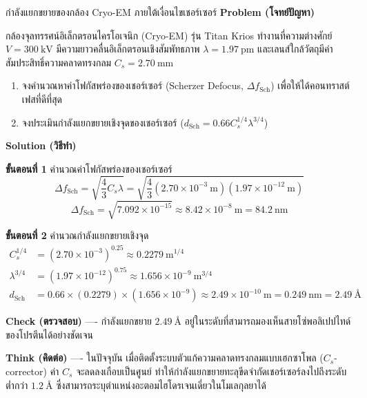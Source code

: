 \begin{psctbox}{กำลังแยกขยายของกล้อง Cryo-EM ภายใต้เงื่อนไขเชอร์เซอร์}
\textbf{Problem (โจทย์ปัญหา)}

กล้องจุลทรรศน์อิเล็กตรอนไครโอเจนิก (Cryo-EM) รุ่น Titan Krios ทำงานที่ความต่างศักย์ $V = 300~\text{kV}$ มีความยาวคลื่นอิเล็กตรอนเชิงสัมพัทธภาพ $\lambda = 1.97~\text{pm}$ และเลนส์ใกล้วัตถุมีค่าสัมประสิทธิ์ความคลาดทรงกลม $C_s = 2.70~\text{mm}$
\begin{enumerate}
    \item จงคำนวณหาค่าโฟกัสพร่องของเชอร์เซอร์ (Scherzer Defocus, $\Delta f_{\text{Sch}}$) เพื่อให้ได้คอนทราสต์เฟสที่ดีที่สุด
    \item จงประเมินกำลังแยกขยายเชิงจุดของเชอร์เซอร์ ($d_{\text{Sch}} = 0.66 C_s^{1/4} \lambda^{3/4}$)
\end{enumerate}

\textbf{Solution (วิธีทำ)}

\textbf{ขั้นตอนที่ 1} คำนวณค่าโฟกัสพร่องของเชอร์เซอร์
\begin{equation*}
\Delta f_{\text{Sch}} = \sqrt{\frac{4}{3} C_s \lambda} = \sqrt{\frac{4}{3}(2.70 \times 10^{-3}~\text{m})(1.97 \times 10^{-12}~\text{m})}
\end{equation*}
\begin{equation*}
\Delta f_{\text{Sch}} = \sqrt{7.092 \times 10^{-15}} \approx 8.42 \times 10^{-8}~\text{m} = 84.2~\text{nm}
\end{equation*}

\textbf{ขั้นตอนที่ 2} คำนวณกำลังแยกขยายเชิงจุด
\begin{align*}
C_s^{1/4} &= (2.70 \times 10^{-3})^{0.25} \approx 0.2279~\text{m}^{1/4} \\
\lambda^{3/4} &= (1.97 \times 10^{-12})^{0.75} \approx 1.656 \times 10^{-9}~\text{m}^{3/4} \\
d_{\text{Sch}} &= 0.66 \times (0.2279) \times (1.656 \times 10^{-9}) \approx 2.49 \times 10^{-10}~\text{m} = 0.249~\text{nm} = 2.49~\text{\AA}
\end{align*}

\textbf{Check (ตรวจสอบ)} ---- กำลังแยกขยาย $2.49~\text{\AA}$ อยู่ในระดับที่สามารถมองเห็นสายโซ่พอลิเปปไทด์ของโปรตีนได้อย่างชัดเจน

\textbf{Think (คิดต่อ)} ---- ในปัจจุบัน เมื่อติดตั้งระบบตัวแก้ความคลาดทรงกลมแบบเฮกซาโพล ($C_s$-corrector) ค่า $C_s$ จะลดลงเกือบเป็นศูนย์ ทำให้กำลังแยกขยายทะลุขีดจำกัดเชอร์เซอร์ลงไปถึงระดับต่ำกว่า $1.2~\text{\AA}$ ซึ่งสามารถระบุตำแหน่งอะตอมไฮโดรเจนเดี่ยวในโมเลกุลยาได้
\end{psctbox}


